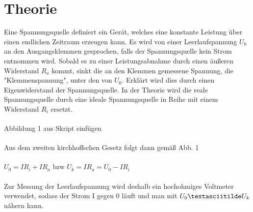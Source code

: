 \section{Theorie}
\label{sec:Theorie}

Eine Spannungsquelle definiert ein Gerät, welches eine konstante Leistung über
einen endlichen Zeitraum erzeugen kann. Es wird von einer Leerlaufspannung $ U_0 $
an den Ausgangsklemmen gesprochen, falls der Spannungsquelle kein Strom entnommen wird.
Sobald es zu einer Leistungsabnahme durch einen äußeren Widerstand $ R_a $ kommt,
sinkt die an den Klemmen gemessene Spannung, die "Klemmenspannung", unter den von $ U_0 $. Erklärt wird
dies durch einen Eigenwiderstand der Spannungsquelle. In der Theorie wird die reale
Spannungsquelle durch eine ideale Spannungsquelle in Reihe mit einem Widerstand $ R_i$
ersetzt.
\\
\\
{\huge Abbildung 1 aus Skript einfügen}
\\
\\
Aus dem zweiten kirchhoffschen Gesetz folgt dann gemäß Abb. 1
\\
\\
$ U_0 = I R_i + I R_a $ bzw $ U_k = I R_a = U_0-IR_i$
\\
\\
Zur Messung der Leerlaufspannung wird deshalb ein hochohmiges Voltmeter verwendet,
sodass der Strom I gegen 0 läuft und man mit $ U_0 \textasciitilde U_k$ nähern kann.


